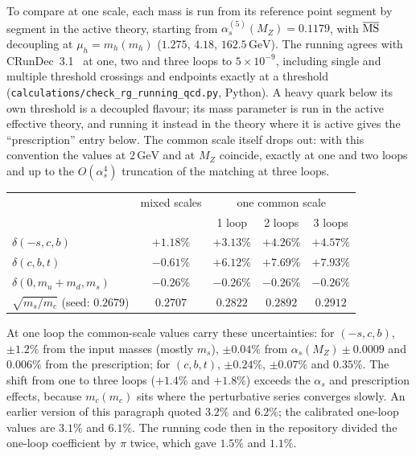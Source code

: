 \documentclass[12pt,a4paper]{article}
\newcommand{\GeV}{\,\text{GeV}}
\begin{document}
To compare at one scale, each mass is run from its reference point
segment by segment in the active theory, starting from
$\alpha_s^{(5)}(M_Z) = 0.1179$, with $\overline{\rm MS}$ decoupling at
$\mu_h = m_h(m_h)$ ($1.275$, $4.18$, $162.5\GeV$). The running agrees
with CRunDec~3.1~\cite{CRunDec} at one, two and three loops to
$5\times10^{-9}$, including single and multiple threshold crossings and
endpoints exactly at a threshold
(\texttt{calculations/check\_rg\_running\_qcd.py}, Python). A heavy quark
below its own threshold is a decoupled flavour; its mass parameter is
run in the active effective theory, and running it instead in the theory
where it is active gives the ``prescription'' entry below. The common
scale itself drops out: with this convention the values at $2\GeV$ and
at $M_Z$ coincide, exactly at one and two loops and up to the
$O(\alpha_s^4)$ truncation of the matching at three loops.
\begin{center}
\small
\begin{tabular}{lcccc}
\toprule
 & mixed scales & \multicolumn{3}{c}{one common scale} \\
 & & 1 loop & 2 loops & 3 loops \\
\midrule
$\delta(-s,c,b)$ & $+1.18\%$ & $+3.13\%$ & $+4.26\%$ & $+4.57\%$ \\
$\delta(c,b,t)$ & $-0.61\%$ & $+6.12\%$ & $+7.69\%$ & $+7.93\%$ \\
$\delta(0,m_u{+}m_d,m_s)$ & $-0.26\%$ & $-0.26\%$ & $-0.26\%$ & $-0.26\%$ \\
$\sqrt{m_s/m_c}$ (seed: $0.2679$) & $0.2707$ & $0.2822$ & $0.2892$ & $0.2912$ \\
\bottomrule
\end{tabular}
\end{center}
At one loop the common-scale values carry these uncertainties: for
$(-s,c,b)$, $\pm1.2\%$ from the input masses (mostly $m_s$), $\pm0.04\%$
from $\alpha_s(M_Z) \pm 0.0009$ and $0.006\%$ from the prescription; for
$(c,b,t)$, $\pm0.24\%$, $\pm0.07\%$ and $0.35\%$. The shift from one to
three loops ($+1.4\%$ and $+1.8\%$) exceeds the $\alpha_s$ and
prescription effects, because $m_c(m_c)$ sits where the perturbative
series converges slowly. An earlier version of this paragraph quoted
$3.2\%$ and $6.2\%$; the calibrated one-loop values are $3.1\%$ and
$6.1\%$. The running code then in the repository divided the one-loop
coefficient by $\pi$ twice, which gave $1.5\%$ and $1.1\%$.
\end{document}
